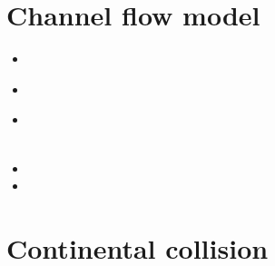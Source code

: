 \section{Channel flow model} 

\begin{small}
\begin{itemize}
\item[\twothousand] 
\item[\twothousandfour] 
 \\
\item[\twothousandsix] 
 \\
 \\
\item[\twothousandseven] 
\item[\twothousandeleven] 
\end{itemize}
\end{small}

\section{Continental collision} 


